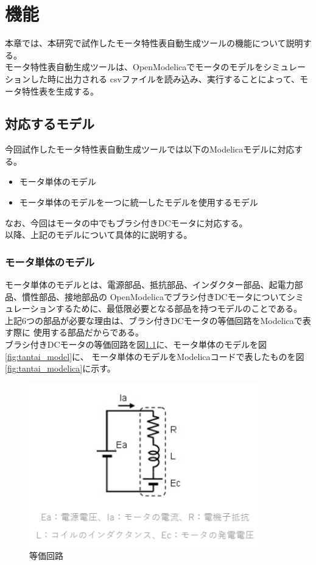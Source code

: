 \chapter{機能}\label{cha:Function}

本章では、本研究で試作したモータ特性表自動生成ツールの機能について説明する。\\

モータ特性表自動生成ツールは、OpenModelicaでモータのモデルをシミュレーションした時に出力される
csvファイルを読み込み、実行することによって、モータ特性表を生成する。\\

\section{対応するモデル}\label{taioumodel}
今回試作したモータ特性表自動生成ツールでは以下のModelicaモデルに対応する。
\begin{itemize}
	\item モータ単体のモデル
	\item モータ単体のモデルを一つに統一したモデルを使用するモデル
\end{itemize}
なお、今回はモータの中でもブラシ付きDCモータに対応する。\\
以降、上記のモデルについて具体的に説明する。

\subsection{モータ単体のモデル}\label{sec:sub1}
モータ単体のモデルとは、電源部品、抵抗部品、インダクター部品、起電力部品、慣性部品、接地部品の
OpenModelicaでブラシ付きDCモータについてシミュレーションするために、最低限必要となる部品を持つモデルのことである。\\
上記6つの部品が必要な理由は、ブラシ付きDCモータの等価回路\cite{等価回路}をModelicaで表す際に
使用する部品\cite{modelicaシステム本}だからである。\\
ブラシ付きDCモータの等価回路を図\ref{fig:touka}に、モータ単体のモデルを図\ref{fig:tantai_model}に、
モータ単体のモデルをModelicaコードで表したものを図\ref{fig:tantai_modelica}に示す。

\begin{figure}[t]
	\centering
	\includegraphics[width=10cm]{./Image/touka.png}
	\caption{等価回路}
	\label{fig:touka}
  \end{figure}

